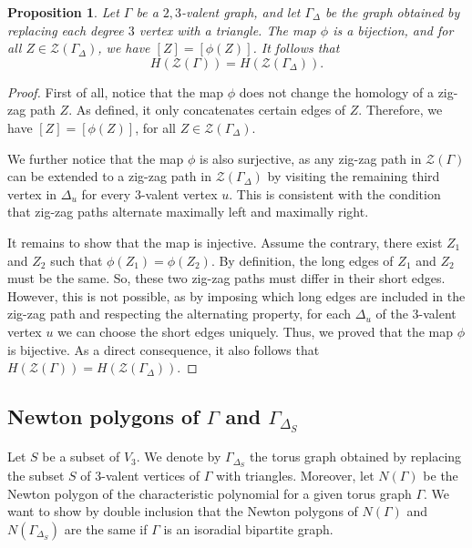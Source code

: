 \documentclass[12pt,a4paper]{article}
\newtheorem{prop}[thm]{Proposition}
\theoremstyle{definition}
\begin{document}
\begin{prop} \label{homologies_gamma_delta}
    Let $\Gamma$ be a $2, 3$-valent graph, and let $\Gamma_{\Delta}$ be the graph obtained by replacing each degree $3$ vertex with a triangle. The map $\phi$ is a bijection, and for all $Z \in \mathcal{Z}(\Gamma_{\Delta})$, we have $[Z] = [\phi(Z)]$. It follows that
    \[H(\mathcal{Z}(\Gamma)) = H(\mathcal{Z}(\Gamma_{\Delta})).\]
\end{prop}

\begin{proof}
    First of all, notice that the map $\phi$ does not change the homology of a zig-zag path $Z$. As defined, it only concatenates certain edges of $Z$. Therefore, we have $[Z] = [\phi(Z)]$, for all  $Z \in \mathcal{Z}(\Gamma_{\Delta})$. 

    We further notice that the map $\phi$ is also surjective, as any zig-zag path in $\mathcal{Z}(\Gamma)$ can be extended to a zig-zag path in $\mathcal{Z}(\Gamma_{\Delta})$ by visiting the remaining third vertex in $\Delta_u$ for every $3$-valent vertex $u$. This is consistent with the condition that zig-zag paths alternate maximally left and maximally right.
    
    It remains to show that the map is injective. Assume the contrary, there exist $Z_1$ and $Z_2$ such that $\phi(Z_1) = \phi(Z_2)$. By definition, the long edges of $Z_1$ and $Z_2$ must be the same. So, these two zig-zag paths must differ in their short edges. However, this is not possible, as by imposing which long edges are included in the zig-zag path and respecting the alternating property, for each $\Delta_u$ of the $3$-valent vertex $u$ we can choose the short edges uniquely. Thus, we proved that the map $\phi$ is bijective. As a direct consequence, it also follows that $H(\mathcal{Z}(\Gamma)) = H(\mathcal{Z}(\Gamma_{\Delta}))$.
\end{proof}

\subsection*{Newton polygons of $\Gamma$ and $\Gamma_{\Delta_S}$}

Let $S$ be a subset of $V_3$. We denote by $\Gamma_{\Delta_S}$ the torus graph obtained by replacing the subset $S$ of $3$-valent vertices of $\Gamma$ with triangles. Moreover, let $N(\Gamma)$ be the Newton polygon of the characteristic polynomial for a given torus graph $\Gamma$. We want to show by double inclusion that the Newton polygons of $N(\Gamma)$ and $N(\Gamma_{\Delta_S})$ are the same if $\Gamma$ is an isoradial bipartite graph. 
\end{document}
